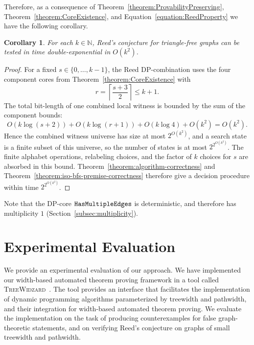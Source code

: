 \documentclass[11pt,a4paper]{article}
\newtheorem{corollary}[theorem]{Corollary}
\newcommand{\treewidthvalue}{k}
\newcommand{\N}{\mathbb{N}}
\newcommand{\dpNamePart}[1]{\mbox{\normalfont\ttfamily #1}}
\newcommand{\hasMultiEdgeCore}{\dpNamePart{HasMultipleEdges}}
\newcommand{\numbercolors}{r}
\begin{document}
Therefore, as a consequence of Theorem~\ref{theorem:ProvabilityPreserving}, Theorem~\ref{theorem:CoreExistence}, and Equation~\eqref{equation:ReedProperty} we have the following corollary.
%
\begin{corollary}
\label{corollary:ComplexityReed} For each $\treewidthvalue\in \N$, Reed's conjecture for triangle-free graphs can be tested in time double-exponential in $O(\treewidthvalue^2)$.
\end{corollary}
\begin{proof}
For a fixed $s\in\{0,\dots,\treewidthvalue-1\}$, the Reed DP-combination uses the four component cores from Theorem~\ref{theorem:CoreExistence} with
\[
\numbercolors=\left\lceil\frac{s+3}{2}\right\rceil\le \treewidthvalue+1.
\]
The total bit-length of one combined local witness is bounded by the sum of the component bounds:
\[
O(\treewidthvalue\log(s+2))+
O(\treewidthvalue\log(\numbercolors+1))+
O(\treewidthvalue\log 4)+
O(\treewidthvalue^2)
=O(\treewidthvalue^2).
\]
Hence the combined witness universe has size at most $2^{O(\treewidthvalue^2)}$, and a search state is a finite subset of this universe, so the number of states is at most $2^{2^{O(\treewidthvalue^2)}}$.
The finite alphabet operations, relabeling choices, and the factor of $\treewidthvalue$ choices for $s$ are absorbed in this bound.
Theorem~\ref{theorem:algorithm-correctness} and Theorem~\ref{theorem:iso-bfs-premise-correctness} therefore give a decision procedure within time $2^{2^{O(\treewidthvalue^2)}}$.
\end{proof}
%
Note that the DP-core $\hasMultiEdgeCore$ is deterministic, and therefore has multiplicity $1$ (Section~\ref{subsec:multiplicity}).

\section{Experimental Evaluation}
\label{section:Experiments}

We provide an experimental evaluation of our
approach. We have implemented our width-based automated theorem proving framework in a tool called \textsc{TreeWidzard}~\cite{treewidzard}. The tool provides an interface that facilitates the implementation of dynamic programming algorithms parameterized by treewidth and pathwidth, and their integration for width-based automated theorem proving. We evaluate the implementation on the task of producing counterexamples for false graph-theoretic statements, and on verifying Reed's conjecture on graphs of small treewidth and pathwidth.
\end{document}
